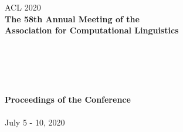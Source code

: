 \documentclass[11pt]{article}
\begin{document}
  \begin{center}
  \LARGE ACL 2020 \\
  \vspace*{55mm}
    {\bf
    \LARGE
     The 58th Annual Meeting of the \\
     Association for Computational Linguistics\\
    \hspace*{1cm}\\ \hspace*{1cm} \\
    \hspace*{1cm} \\ \hspace*{1cm}\\
    \hspace*{1cm}\\
    \vspace{2cm}
    \LARGE
    Proceedings of the Conference\\
    \vspace{2cm}
    \hspace*{1cm}} \\ %
    \vspace{43mm}
    \LARGE
    July 5 - 10, 2020
  \end{center}
\end{document}
